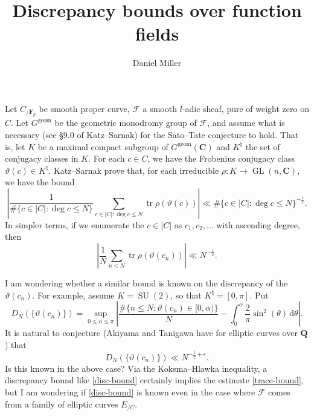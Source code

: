\documentclass{article}
\title{Discrepancy bounds over function fields}
\author{Daniel Miller}
\DeclareMathOperator{\GL}{GL}
\DeclareMathOperator{\SU}{SU}
\DeclareMathOperator{\tr}{tr}
\newcommand{\bC}{\mathbf{C}}
\newcommand{\bF}{\mathbf{F}}
\newcommand{\bQ}{\mathbf{Q}}
\newcommand{\cF}{\mathcal{F}}
\begin{document}
\maketitle





Let $C_{/\bF_p}$ be smooth proper curve, $\cF$ a smooth $l$-adic sheaf, pure of 
weight zero on $C$. Let $G^\mathrm{geom}$ be the geometric monodromy group of 
$\cF$, and assume what is necessary (see \S9.0 of Katz--Sarnak) for the 
Sato--Tate conjecture to hold. That is, let $K$ be a maximal compact subgroup 
of $G^\mathrm{geom}(\bC)$ and $K^\natural$ the set of conjugacy classes in $K$. 
For each $c\in C$, we have the Frobenius conjugacy class 
$\vartheta(c)\in K^\natural$. Katz--Sarnak prove that, for each irreducible 
$\rho\colon K\to \GL(n,\bC)$, we have the bound
\[
	\left| \frac{1}{\#\{c\in |C|:\deg c\leqslant N\}} \sum_{c\in |C|:\deg c\leqslant N} \tr \rho(\vartheta(c))\right| \ll \#\{c\in |C|:\deg c\leqslant N\}^{-\frac 1 2} .
\]
In simpler terms, if we enumerate the $c\in |C|$ as $c_1,c_2,\dots$ with ascending 
degree, then 
\begin{equation}\label{trace-bound}
	\left| \frac{1}{N} \sum_{n\leqslant N} \tr \rho(\vartheta(c_n))\right| \ll N^{-\frac 1 2} .
\end{equation}

I am wondering whether a similar bound is known on the discrepancy of the $\vartheta(c_n)$. 
For example, assume $K=\SU(2)$, so that $K^\natural=[0,\pi]$. Put 
\[
	D_N(\{\vartheta(c_n)\}) = \sup_{0\leqslant \alpha\leqslant \pi} \left| \frac{\#\{n\leqslant N : \vartheta(c_n)\in [0,\alpha)\}}{N} - \int_0^\alpha \frac{2}{\pi} \sin^2(\theta)\, \mathrm{d}\theta\right| .
\]
It is natural to conjecture (Akiyama and Tanigawa have for elliptic curves over 
$\bQ$) that 
\begin{equation}\label{disc-bound}
	D_N(\{\vartheta(c_n)\}) \ll N^{-\frac 1 2+\epsilon} .
\end{equation}
Is this known in the above case? Via the Koksma--Hlawka inequality, a discrepancy 
bound like \eqref{disc-bound} certainly implies the estimate \eqref{trace-bound}, 
but I am wondering if \eqref{disc-bound} is known even in the case where $\cF$ comes 
from a family of elliptic curves $E_{/C}$. 
\end{document}

